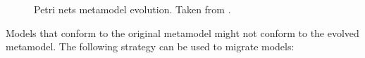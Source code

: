 \begin{figure}[htb]
	\centering
	\caption[Petri nets metamodel evolution]{Petri nets metamodel evolution. Taken from \cite{rose10flock}.}
\label{fig:petri_nets_mms}
\end{figure}

Models that conform to the original metamodel might not conform to the evolved metamodel. The following strategy can be used to migrate models:

